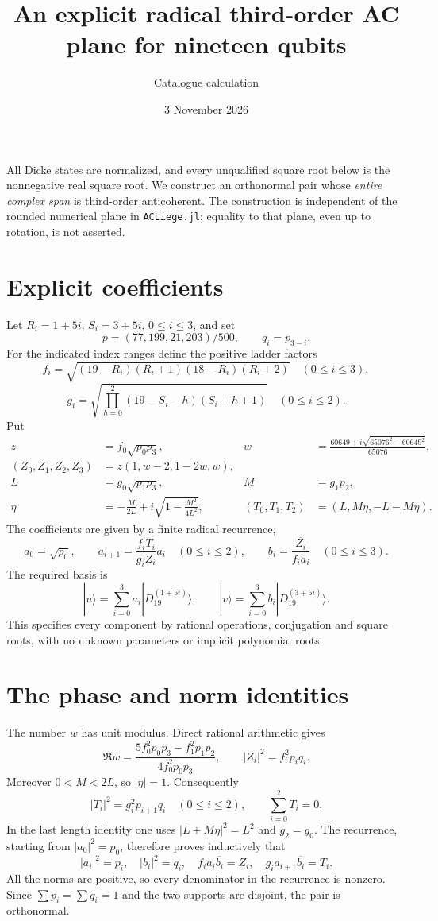 \documentclass[11pt]{article}
\newcommand{\D}[1]{|D_{19}^{(#1)}\rangle}
\begin{document}
\title{An explicit radical third-order AC plane for nineteen qubits}
\author{Catalogue calculation}\date{3 November 2026}\maketitle
All Dicke states are normalized, and every unqualified square root below is
the nonnegative real square root. We construct an orthonormal pair whose
\emph{entire complex span} is third-order anticoherent. The construction is
independent of the rounded numerical plane in \texttt{ACLiege.jl}; equality to
that plane, even up to rotation, is not asserted.

\section{Explicit coefficients}
Let $R_i=1+5i$, $S_i=3+5i$, $0\leq i\leq3$, and set
\[
 p=(77,199,21,203)/500,\qquad q_i=p_{3-i}.
\]
For the indicated index ranges define the positive ladder factors
\[
 f_i=\sqrt{(19-R_i)(R_i+1)(18-R_i)(R_i+2)}\quad(0\leq i\leq3),
\]
\[
 g_i=\sqrt{\prod_{h=0}^{2}(19-S_i-h)(S_i+h+1)}\quad(0\leq i\leq2).
\]
Put
\begin{align*}
 z&=f_0\sqrt{p_0p_3},&
 w&=\frac{60649+i\sqrt{65076^2-60649^2}}{65076},\\
 (Z_0,Z_1,Z_2,Z_3)&=z(1,w-2,1-2w,w),\\
 L&=g_0\sqrt{p_1p_3},&M&=g_1p_2,\\
 \eta&=-\frac{M}{2L}+i\sqrt{1-\frac{M^2}{4L^2}},&
 (T_0,T_1,T_2)&=(L,M\eta,-L-M\eta).
\end{align*}
The coefficients are given by a finite radical recurrence,
\[
 a_0=\sqrt{p_0},\qquad
 a_{i+1}=\frac{f_iT_i}{g_iZ_i}a_i\quad(0\leq i\leq2),
 \qquad b_i=\overline{\frac{Z_i}{f_i a_i}}\quad(0\leq i\leq3).
\]
The required basis is
\[
 |u\rangle=\sum_{i=0}^{3}a_i\D{1+5i},\qquad
 |v\rangle=\sum_{i=0}^{3}b_i\D{3+5i}.
\]
This specifies every component by rational operations, conjugation and square
roots, with no unknown parameters or implicit polynomial roots.

\section{The phase and norm identities}
The number $w$ has unit modulus. Direct rational arithmetic gives
\[
 \Re w=\frac{5f_0^2p_0p_3-f_1^2p_1p_2}{4f_0^2p_0p_3},
 \qquad |Z_i|^2=f_i^2p_iq_i.
\]
Moreover $0<M<2L$, so $|\eta|=1$. Consequently
\[
 |T_i|^2=g_i^2p_{i+1}q_i\quad(0\leq i\leq2),\qquad
 \sum_{i=0}^{2}T_i=0.
\]
In the last length identity one uses
$|L+M\eta|^2=L^2$ and $g_2=g_0$.
The recurrence, starting from $|a_0|^2=p_0$, therefore proves inductively that
\[
 |a_i|^2=p_i,\quad |b_i|^2=q_i,\quad
 f_i a_i\overline{b_i}=Z_i,\quad
 g_i a_{i+1}\overline{b_i}=T_i.
\]
All the norms are positive, so every denominator in the recurrence is nonzero.
Since $\sum p_i=\sum q_i=1$ and the two supports are disjoint, the pair is
orthonormal.
\end{document}
